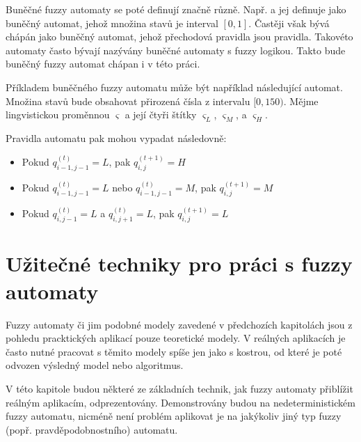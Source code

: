 \documentclass[a4paper,10pt]{article}
\begin{document}
Buněčné fuzzy automaty se poté definují značně různě. Např. \cite{For-FuzCelAutConjNormForm} a \cite{MraZimLapBaj-FuzCelAut+} jej definuje jako buněčný automat, jehož množina stavů je interval $[0,1]$. Častěji však bývá chápán jako buněčný automat, jehož přechodová pravidla jsou \ifthen pravidla. Takovéto automaty často bývají nazývány buněčné automaty s fuzzy logikou. Takto bude buněčný fuzzy automat chápan i v této práci.


\begin{example}
 Příkladem buněčného fuzzy automatu může být například následující automat. Množina stavů bude obsahovat přirozená čísla z intervalu $[0, 150)$. Mějme lingvistickou proměnnou $\varsigma$ a její čtyři štítky $\varsigma_L$, $\varsigma_M$, a $\varsigma_H$.

 Pravidla automatu pak mohou vypadat následovně:
 \begin{itemize}
  \item Pokud $q^{(t)}_{i-1,j-1} = L$, pak $q^{(t+1)}_{i,j} = H$
  \item Pokud $q^{(t)}_{i-1,j-1} = L$ nebo $q^{(t)}_{i-1,j-1} = M$, pak $q^{(t+1)}_{i,j} = M$
  \item Pokud $q^{(t)}_{i,j-1} = L$ a $q^{(t)}_{i,j+1} = L$, pak $q^{(t+1)}_{i,j} = L$
 \end{itemize}
\end{example}




\section{Užitečné techniky pro práci s fuzzy automaty}

Fuzzy automaty či jim podobné modely zavedené v předchozích kapitolách jsou z pohledu pracktických aplikací pouze teoretické modely. V reálných aplikacích je často nutné pracovat s těmito modely spíše jen jako s kostrou, od které je poté odvozen výsledný model nebo algoritmus.

V této kapitole budou některé ze základních technik, jak fuzzy automaty přiblížit reálným aplikacím, odprezentovány. Demonstrovány budou na nedeterministickém fuzzy automatu, nicméně není problém aplikovat je na jakýkoliv jiný typ fuzzy (popř. pravděpodobnostního) automatu.
\end{document}
